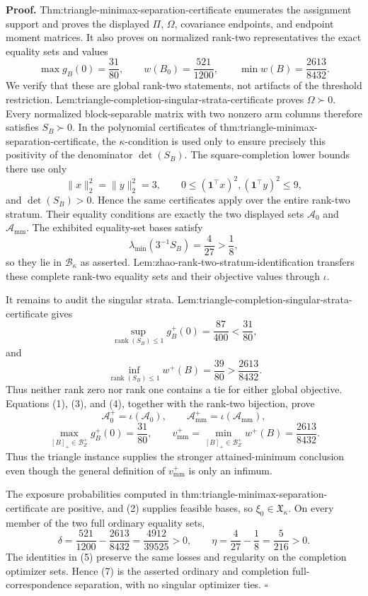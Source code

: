 \textbf{Proof.}
Thm:triangle-minimax-separation-certificate enumerates the assignment support and proves the displayed \(\Pi\), \(\Omega\), covariance endpoints, and endpoint moment matrices.  It also proves on normalized rank-two representatives the exact equality sets and values
\[
\max g_B(0)=\frac{31}{80},
\qquad
w(B_0)=\frac{521}{1200},
\qquad
\min w(B)=\frac{2613}{8432}.                                      \tag{1}
\]
We verify that these are global rank-two statements, not artifacts of the threshold restriction.  Lem:triangle-completion-singular-strata-certificate proves \(\Omega\succ0\).  Every normalized block-separable matrix with two nonzero arm columns therefore satisfies \(S_B\succ0\).  In the polynomial certificates of thm:triangle-minimax-separation-certificate, the \(\kappa\)-condition is used only to ensure precisely this positivity of the denominator \(\det(S_B)\).  The square-completion lower bounds there use only
\[
\lVert x\rVert_2^2=\lVert y\rVert_2^2=3,
\qquad
0\le(\mathbf1^{\top}x)^2,(\mathbf1^{\top}y)^2\le9,
\]
and \(\det(S_B)>0\).  Hence the same certificates apply over the entire rank-two stratum.  Their equality conditions are exactly the two displayed sets \(\mathcal A_0\) and \(\mathcal A_{\mathrm{mm}}\).  The exhibited equality-set bases satisfy
\[
\lambda_{\min}(3^{-1}S_B)=\frac4{27}>\frac18,                     \tag{2}
\]
so they lie in \(\mathcal B_\kappa\) as asserted.  Lem:zhao-rank-two-stratum-identification transfers these complete rank-two equality sets and their objective values through \(\iota\).

It remains to audit the singular strata.  Lem:triangle-completion-singular-strata-certificate gives
\[
\sup_{\operatorname{rank}(S_B)\le1}g_B^+(0)
=\frac{87}{400}<\frac{31}{80},                                    \tag{3}
\]
and
\[
\inf_{\operatorname{rank}(S_B)\le1}w^+(B)
=\frac{39}{80}>\frac{2613}{8432}.                                 \tag{4}
\]
Thus neither rank zero nor rank one contains a tie for either global objective.  Equations (1), (3), and (4), together with the rank-two bijection, prove
\[
\mathcal A_0^+=\iota(\mathcal A_0),
\qquad
\mathcal A_{\mathrm{mm}}^+=\iota(\mathcal A_{\mathrm{mm}}),       \tag{5}
\]
\[
\max_{[B]_+\in\mathcal B_Z^+}g_B^+(0)=\frac{31}{80},
\qquad
v_{\mathrm{mm}}^+
=\min_{[B]_+\in\mathcal B_Z^+}w^+(B)
=\frac{2613}{8432}.                                                \tag{6}
\]
Thus the triangle instance supplies the stronger attained-minimum conclusion even though the general definition of \(v_{\mathrm{mm}}^+\) is only an infimum.

The exposure probabilities computed in thm:triangle-minimax-separation-certificate are positive, and (2) supplies feasible bases, so \(\xi_0\in\mathfrak X_\kappa\).  On every member of the two full ordinary equality sets,
\[
\delta
=\frac{521}{1200}-\frac{2613}{8432}
=\frac{4912}{39525}>0,
\qquad
\eta
=\frac4{27}-\frac18
=\frac5{216}>0.                                                     \tag{7}
\]
The identities in (5) preserve the same losses and regularity on the completion optimizer sets.  Hence (7) is the asserted ordinary and completion full-correspondence separation, with no singular optimizer ties. \(\square\)